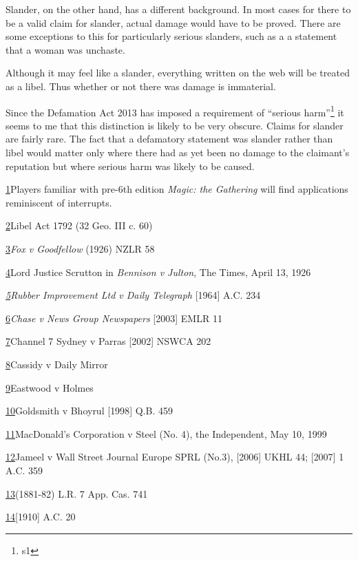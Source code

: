 \documentclass[]{article}
\begin{document}
Slander, on the other hand, has a different background. In most cases
for there to be a valid claim for slander, actual damage would have to
be proved. There are some exceptions to this for particularly serious
slanders, such as a a statement that a woman was unchaste.

Although it may feel like a slander, everything written on the web will
be treated as a libel. Thus whether or not there was damage is
immaterial.

Since the Defamation Act 2013 has imposed a requirement of ``serious harm''\footnote{s1} it seems to me that this distinction is likely to be very obscure. Claims for slander are fairly rare. The fact that a defamatory statement was slander rather than libel would matter only where there had as yet been no damage to the claimant's reputation but where serious harm was likely to be caused.


\hyperref[sdfootnote1anc]{1}Players familiar with pre-6th edition
\emph{Magic: the Gathering} will find applications reminiscent of
interrupts.

\hyperref[sdfootnote2anc]{2}Libel Act 1792 (32 Geo. III c. 60)

\hyperref[sdfootnote3anc]{3}\emph{Fox v Goodfellow} (1926) NZLR 58

\hyperref[sdfootnote4anc]{4}Lord Justice Scrutton in \emph{Bennison v
Julton}{, The Times, April 13, 1926}

\emph{\hyperref[sdfootnote5anc]{5}Rubber Improvement Ltd v Daily
Telegraph}{ {[}1964{]} A.C. 234}

\hyperref[sdfootnote6anc]{6}\emph{Chase v News Group Newspapers}
{[}2003{]} EMLR 11

\hyperref[sdfootnote7anc]{7}Channel 7 Sydney v Parras {[}2002{]} NSWCA
202

\hyperref[sdfootnote8anc]{8}Cassidy v Daily Mirror

\hyperref[sdfootnote9anc]{9}Eastwood v Holmes

\hyperref[sdfootnote10anc]{10}Goldsmith v Bhoyrul {[}1998{]} Q.B. 459

\hyperref[sdfootnote11anc]{11}MacDonald's Corporation v Steel (No. 4),
the Independent, May 10, 1999

\hyperref[sdfootnote12anc]{12}Jameel v Wall Street Journal Europe SPRL
(No.3), {[}2006{]} UKHL 44; {[}2007{]} 1 A.C. 359

\hyperref[sdfootnote13anc]{13}(1881-82) L.R. 7 App. Cas. 741

\hyperref[sdfootnote14anc]{14}{[}1910{]} A.C. 20
\end{document}
